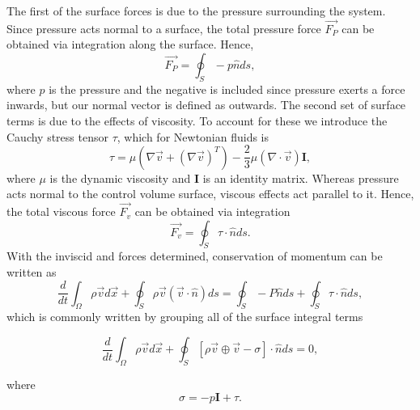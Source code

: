 The first of the surface forces is due to the pressure surrounding the system. Since pressure acts normal to a surface, the total pressure force $\vec{F_P}$ can be obtained via integration along the surface. Hence,
\begin{equation}
	\vec{F_P} = \oint_S -p\hat{n} ds,
\end{equation}
where $p$ is the pressure and the negative is included since pressure exerts a force inwards, but our normal vector is defined as outwards. The second set of surface terms is due to the effects of viscosity. To account for these we introduce the Cauchy stress tensor $\tau$, which for Newtonian fluids is
\begin{equation}
	\tau = \mu \left(\nabla \vec{v} + \left(\nabla \vec{v} \right)^T \right) - \frac{2}{3} \mu \left(\nabla \cdot \vec{v} \right) \mathbf{I},
\end{equation}
where $\mu$ is the dynamic viscosity and $\mathbf{I}$ is an identity matrix. Whereas pressure acts normal to the control volume surface, viscous effects act parallel to it. Hence, the total viscous force $\vec{F_v}$ can be obtained via integration
\begin{equation}
	\vec{F_v} = \oint_S \tau \cdot \hat{n} ds.
\end{equation}
With the inviscid and forces determined, conservation of momentum can be written as
\begin{equation}
	 \frac{d}{dt}\int_\Omega \rho \vec{v} d\vec{x} + \oint_S \rho \vec{v} (\vec{v} \cdot \hat{n}) ds = \oint_S -P\hat{n} ds + \oint_S \tau \cdot \hat{n} ds,
\end{equation}
which is commonly written by grouping all of the surface integral terms
\begin{eqBox}
\begin{equation}
	 \frac{d}{dt}\int_\Omega \rho \vec{v} d\vec{x} + \oint_S \left[ \rho \vec{v} \oplus \vec{v} - \sigma \right]\cdot \hat{n} ds =  0,
\end{equation}
\end{eqBox}
where
\begin{equation}
	\sigma = -p \mathbf{I} + \tau.
\end{equation}

